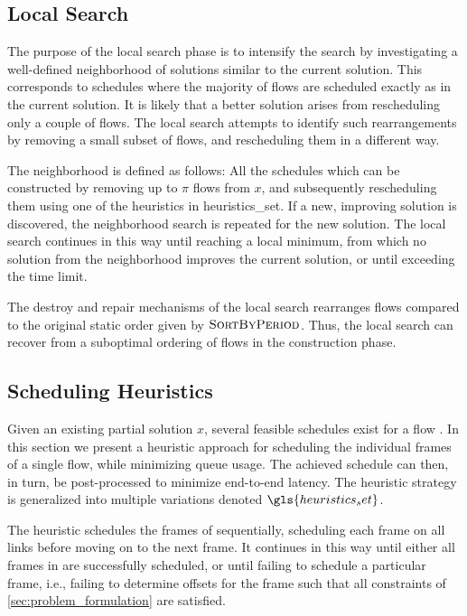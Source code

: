 \subsection{Local Search} \label{sec:local_search_phase}
The purpose of the local search phase is to intensify the search by investigating a well-defined neighborhood of solutions similar to the current solution. This corresponds to schedules where the majority of flows are scheduled exactly as in the current solution. It is likely that a better solution arises from rescheduling only a couple of flows. The local search attempts to identify such rearrangements by removing a small subset of flows, and rescheduling them in a different way.

The neighborhood is defined as follows: All the schedules which can be constructed by removing up to $\pi$ flows from $x$, and subsequently rescheduling them using one of the heuristics in \gls{heuristics_set}. If a new, improving solution is discovered, the neighborhood search is repeated for the new solution. The local search continues in this way until reaching a local minimum, from which no solution from the neighborhood improves the current solution, or until exceeding the time limit.

The destroy and repair mechanisms of the local search rearranges flows compared to the original static order given by $\Call{SortByPeriod}{}$. Thus, the local search can recover from a suboptimal ordering of flows in the construction phase.

\subsection{Scheduling Heuristics} \label{sec:heuristics}
Given an existing partial solution $x$, several feasible schedules exist for a flow \s{}. In this section we present a heuristic approach for scheduling the individual frames of a single flow, while minimizing queue usage. The achieved schedule can then, in turn, be post-processed to minimize end-to-end latency. The heuristic strategy is generalized into multiple variations denoted $\gls{heuristics_set}$.

The heuristic schedules the frames of \s{} sequentially, scheduling each frame on all links before moving on to the next frame. It continues in this way until either all frames in \s{} are successfully scheduled, or until failing to schedule a particular frame, i.e., failing to determine offsets for the frame such that all constraints of \autoref{sec:problem_formulation} are satisfied.

